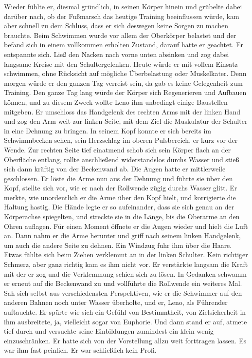 \documentclass[ngerman,smalldemyvopaper,11pt,oneside,onecolumn,openright,extrafontsizes]{memoir}
\begin{document}
Wieder fühlte er, diesmal gründlich, in seinen Körper hinein und grübelte dabei darüber nach, ob der Fußmarsch das heutige Training beeinflussen würde, kam aber schnell zu dem Schluss, dass er sich deswegen keine Sorgen zu machen brauchte. Beim Schwimmen wurde vor allem der Oberkörper belastet und der befand sich in einem vollkommen erholten Zustand, darauf hatte er geachtet. Er entspannte sich. Ließ den Nacken nach vorne unten absinken und zog dabei langsame Kreise mit den Schultergelenken. Heute würde er mit vollem Einsatz schwimmen, ohne Rücksicht auf mögliche Überbelastung oder Muskelkater. Denn morgen würde er den ganzen Tag verreist sein, da gab es keine Gelegenheit zum Training. Den ganze Tag lang würde der Körper sich Regenerieren und Aufbauen können, und zu diesem Zweck wollte Leno ihm unbedingt einige Baustellen mitgeben. Er umschloss das Handgelenk des rechten Arms mit der linken Hand und zog den Arm weit zur linken Seite, mit dem Ziel die Muskulatur der Schulter in eine Dehnung zu bringen. In seinem Kopf konnte er sich bereits im Schwimmbecken sehen, sein Herzschlag im oberen Pulsbereich, er kurz vor der Wende. Zur rechten Seite tief einatmend schob sich sein Körper flach an der Oberfläche entlang, rollte anschließend widerstandslos durchs Wasser und stieß sich dann kräftig von der Beckenwand ab. Die Augen hatte er mittlerweile geschlossen. Er löste die Arme nun aus der Dehnung und führte sie über den Kopf, stellte sich vor, wie er nach der Rollwende zügig durchs Wasser glitt. Er merkte, wie unordentlich er die Arme über den Kopf hielt, und korrigierte die Haltung hastig. Die Hände legte er so aufeinander, dass sie sich genau an der Körperachse spiegelten, und streckte sie in die Länge, bis die Oberarme an den Ohren auflagen. Für einen Moment öffnete er die Augen wieder und hielt die Luft an. Dann nahm er die Arme herunter und griff nach seinem linken Handgelenk, um auch die andere Seite zu dehnen. Ein Windzug fuhr ihm über die Haare. Etwas fühlte sich beim Ziehen verklemmt an in der linken Schulter. Kein richtiger Schmerz, aber ganz richtig kam es ihm nicht vor. Er verstärkte langsam die Kraft mit der er zog und die Verklemmung schien sich zu lösen. In Gedanken schwamm er erneut auf die Beckenwand zu und vollführte die Rollwende ein weiteres Mal. Sah sich selbst aus verschiedensten Perspektiven, wie er die Schwimmer auf den anderen Bahnen noch unter Wasser überholte, und er, Leno, als Führender auftauchte. Er spürte wie sich ein Gefühl von Bestimmtheit, von Zielsicherheit in ihm ausbreitete, ja, vielleicht sogar von Euphorie. Und dann stand er auf, atmete tief durch und versuchte seine Einbildungen zumindest ein klein wenig einzuschränken. Er hatte sich von der Vorstellung allzu weit forttragen lassen. Es war ihm fast peinlich. Er war schließlich kein Profi.\\
\end{document}
